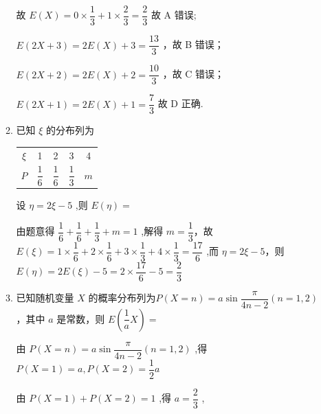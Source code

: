 \begin{enumerate}
\begin{enumerate}
\begin{jieda}
            故 $E\left( X\right)  = 0 \times  \dfrac{1}{3} + 1 \times  \dfrac{2}{3} = \dfrac{2}{3}$ 故 A 错误;
            
            $E\left( {{2X} + 3}\right)  = {2E}\left( X\right)  + 3 = \dfrac{13}{3}$ ，故 B 错误；
            
            $E\left( {{2X} + 2}\right)  = {2E}\left( X\right)  + 2 = \dfrac{10}{3}$ ，故 C 错误；
            
            $E\left( {{2X} + 1}\right)  = {2E}\left( X\right)  + 1 = \dfrac{7}{3}$ 故 D 正确.
        \end{jieda}

        \item 已知 $\xi$ 的分布列为

        \begin{center}
        
        \begin{tabular}{|c|c|c|c|c|}
        \hline
        $\xi$ & 1 & 2 & 3 & 4 \\
        \cline{1-5}
        $P$ & $\dfrac{1}{6}$ & $\dfrac{1}{6}$ & $\dfrac{1}{3}$ & $m$ \\
        \cline{1-5}
        \hline
        \end{tabular}
        
        \end{center}
        
        设 $\eta  = {2\xi } - 5$ ,则 $E\left( \eta \right)  =$
        \begin{jieda}
            由题意得 $\dfrac{1}{6} + \dfrac{1}{6} + \dfrac{1}{3} + m = 1$ ,解得 $m = \dfrac{1}{3}$，故 $E\left( \xi \right)  = 1 \times  \dfrac{1}{6} + 2 \times  \dfrac{1}{6} + 3 \times  \dfrac{1}{3} + 4 \times  \dfrac{1}{3} = \dfrac{17}{6}$ ,而 $\eta  = {2\xi } - 5$，则 $E\left( \eta \right)  = {2E}\left( \xi \right)  - 5 = 2 \times  \dfrac{17}{6} - 5 = \dfrac{2}{3}$
        \end{jieda}

        \item 已知随机变量 $X$ 的概率分布列为$P\left( {X = n}\right)  = a\sin \dfrac{\pi }{{4n} - 2}\left( {n = 1,2}\right)$ ，其中 $a$ 是常数，则 $E\left( {\dfrac{1}{a}X}\right)  =$
        \begin{jieda}
            由 $P\left( {X = n}\right)  = a\sin \dfrac{\pi }{{4n} - 2}\left( {n = 1,2}\right)$ ,得 $P\left( {X = 1}\right)  = a,P\left( {X = 2}\right)  = \dfrac{1}{2}a$
            
            由 $P\left( {X = 1}\right)  + P\left( {X = 2}\right)  = 1$ ,得 $a = \dfrac{2}{3}$ ,
            

\end{jieda}
\end{enumerate}
\end{enumerate}
